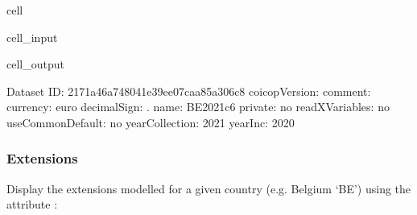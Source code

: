 \documentclass[letterpaper,10pt,english]{sphinxmanual}
\begin{document}
\begin{sphinxuseclass}{cell}
\begin{sphinxuseclass}{cell_input}
\begin{sphinxVerbatim}[commandchars=\\\{\}]
\PYG{p}{[}\PYG{p}{]}\PYG{p}{[}\PYG{p}{]}
\end{sphinxVerbatim}

\end{sphinxuseclass}
\begin{sphinxuseclass}{cell_output}
\begin{sphinxVerbatim}[commandchars=\\\{\}]
\PYGZhy{}\PYGZhy{}\PYGZhy{}\PYGZhy{}\PYGZhy{}\PYGZhy{}\PYGZhy{}\PYGZhy{}\PYGZhy{}\PYGZhy{}\PYGZhy{}\PYGZhy{}\PYGZhy{}\PYGZhy{}\PYGZhy{}\PYGZhy{}\PYGZhy{}\PYGZhy{}\PYGZhy{}\PYGZhy{}\PYGZhy{}\PYGZhy{}\PYGZhy{}\PYGZhy{}\PYGZhy{}\PYGZhy{}\PYGZhy{}\PYGZhy{}\PYGZhy{}\PYGZhy{}
Dataset
\PYGZhy{}\PYGZhy{}\PYGZhy{}\PYGZhy{}\PYGZhy{}\PYGZhy{}\PYGZhy{}\PYGZhy{}\PYGZhy{}\PYGZhy{}\PYGZhy{}\PYGZhy{}\PYGZhy{}\PYGZhy{}\PYGZhy{}\PYGZhy{}\PYGZhy{}\PYGZhy{}\PYGZhy{}\PYGZhy{}\PYGZhy{}\PYGZhy{}\PYGZhy{}\PYGZhy{}\PYGZhy{}\PYGZhy{}\PYGZhy{}\PYGZhy{}\PYGZhy{}\PYGZhy{}
	 ID: \PYGZsq{}2171a46a\PYGZhy{}7480\PYGZhy{}41e3\PYGZhy{}9ee0\PYGZhy{}7caa85a306c8\PYGZsq{}
	 coicopVersion: \PYGZsq{}\PYGZsq{}
	 comment: \PYGZsq{}\PYGZsq{}
	 currency: \PYGZsq{}euro\PYGZsq{}
	 decimalSign: \PYGZsq{}.\PYGZsq{}
	 name: \PYGZsq{}BE\PYGZus{}2021\PYGZus{}c6\PYGZsq{}
	 private: \PYGZsq{}no\PYGZsq{}
	 readXVariables: \PYGZsq{}no\PYGZsq{}
	 useCommonDefault: \PYGZsq{}no\PYGZsq{}
	 yearCollection: \PYGZsq{}2021\PYGZsq{}
	 yearInc: \PYGZsq{}2020\PYGZsq{}
\end{sphinxVerbatim}

\end{sphinxuseclass}
\end{sphinxuseclass}

\subsubsection{Extensions}
\label{\detokenize{userguide:extensions}}
\sphinxAtStartPar
Display the extensions modelled for a given country (e.g. Belgium ‘BE’) using the attribute :
\end{document}
